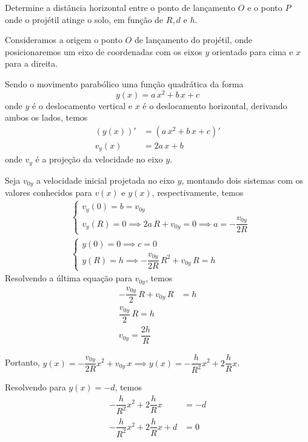 \documentclass[]{IMTexam}
\begin{document}
\begin{questions}
	Determine a distância horizontal entre o ponto de lançamento $ O $ e o ponto $ P $ onde o projétil atinge o solo, em função de $ R, d $ e $ h $.

	\begin{solution}
		Consideramos a origem o ponto $ O $ de lançamento do projétil, onde posicionaremos um eixo de coordenadas com os eixos $ y $ orientado para cima e $ x $ para a direita.

		Sendo o movimento parabólico uma função quadrática da forma \[ y(x)=a\,x^{2}+b\,x+c \]
		onde $ y $ é o deslocamento vertical e $ x $ é o deslocamento horizontal, derivando ambos os lados, temos
		\begin{align*}
			(y(x))' & =(a\,x^{2}+b\,x+c)' \\
			v_y(x)  & =2a\,x+b
		\end{align*}
		onde $ v_y $ é a projeção da velocidade no eixo $ y $.

		Seja $ v_{0y} $ a velocidade inicial projetada no eixo $ y $, montando dois sistemas com os valores conhecidos para $ v(x) $ e $ y(x) $, respectivamente, temos
		\begin{align*}
			 & \begin{cases}
				v_y(0)=b=v_{0y} \\
				v_y(R)=0\implies 2a\,R+v_{0y}=0\implies a=-\dfrac{v_{0y}}{2R}
			\end{cases}  \\
			 & \begin{cases}
				y(0)=0\implies c=0 \\
				y(R)=h\implies -\dfrac{v_{0y}}{2R}\,R^{2}+v_{0y}\,R=h
			\end{cases}
		\end{align*}
		Resolvendo a última equação para $ v_{0y} $, temos
		\begin{align*}
			-\dfrac{v_{0y}}{2}\,R+v_{0y}\,R & =h \\
			\dfrac{v_{0y}}{2}\,R=h               \\
			v_{0y}=\dfrac{2h}{R}
		\end{align*}

		Portanto, $ y(x)=-\dfrac{v_{0y}}{2R}x^{2}+v_{0y}\,x\implies y(x)=-\dfrac{h}{R^{2}}x^{2}+2\dfrac{h}{R}x $.

		Resolvendo para $ y(x)=-d $, temos
		\begin{align*}
			-\dfrac{h}{R^{2}}x^{2}+2\dfrac{h}{R}x   & =-d \\
			-\dfrac{h}{R^{2}}x^{2}+2\dfrac{h}{R}x+d & =0
		\end{align*}


\end{solution}
\end{questions}
\end{document}
